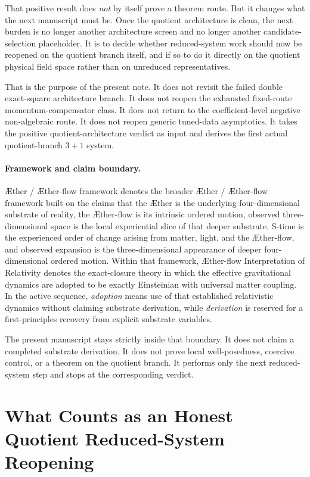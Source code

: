 \documentclass[11pt]{article}
\newcommand{\Aether}{\AE{}ther}
\newcommand{\Aflow}{\AE{}ther-flow}
\newcommand{\TheoryName}{\Aflow{} Interpretation of Relativity}
\newcommand{\TheoryProgram}{\Aether{} / \Aflow{} framework}
\begin{document}
That positive result does \emph{not} by itself prove a theorem route. But it changes what the next manuscript must be. Once the quotient architecture is clean, the next burden is no longer another architecture screen and no longer another candidate-selection placeholder. It is to decide whether reduced-system work should now be reopened on the quotient branch itself, and if so to do it directly on the quotient physical field space rather than on unreduced representatives.

That is the purpose of the present note. It does not revisit the failed double exact-square architecture branch. It does not reopen the exhausted fixed-route momentum-compensator class. It does not return to the coefficient-level negative non-algebraic route. It does not reopen generic tuned-data asymptotics. It takes the positive quotient-architecture verdict as input and derives the first actual quotient-branch \(3+1\) system.

\paragraph{Framework and claim boundary.}
\TheoryProgram{} denotes the broader \Aether{} / \Aflow{} framework built on the claims that the \Aether{} is the underlying four-dimensional substrate of reality, the \Aflow{} is its intrinsic ordered motion, observed three-dimensional space is the local experiential slice of that deeper substrate, S-time is the experienced order of change arising from matter, light, and the \Aflow{}, and observed expansion is the three-dimensional appearance of deeper four-dimensional ordered motion. Within that framework, \TheoryName{} denotes the exact-closure theory in which the effective gravitational dynamics are adopted to be exactly Einsteinian with universal matter coupling. In the active sequence, \emph{adoption} means use of that established relativistic dynamics without claiming substrate derivation, while \emph{derivation} is reserved for a first-principles recovery from explicit substrate variables.

The present manuscript stays strictly inside that boundary. It does not claim a completed substrate derivation. It does not prove local well-posedness, coercive control, or a theorem on the quotient branch. It performs only the next reduced-system step and stops at the corresponding verdict.

\section{What Counts as an Honest Quotient Reduced-System Reopening}
\end{document}
